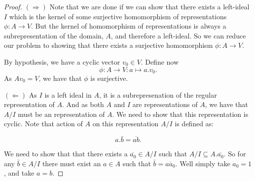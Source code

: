 \begin{proof}

$(\Longrightarrow )$ Note that we are done if we can show that there exists a left-ideal \(I\) which is the kernel of some surjective homomorphism of representations \(\phi :A\rightarrow V\). But the kernel of homomorphism of representations is always a subrepresentation of the domain, \(A\), and therefore a left-ideal. So we can reduce our problem to showing that there exists a surjective homomorphism \(\phi :A\rightarrow V\).

By hypothesis, we have a cyclic vector \(v_{0}\in V\). Define now
\[\phi :A\rightarrow V:a\mapsto a.v_{0}.\]
As \(Av_{0}=V\), we have that \(\phi \) is surjective.

\((\Longleftarrow )\) As \(I\) is a left ideal in \(A\), it is a subrepresenation of the regular representation of \(A\). And as both \(A\) and \(I\) are representations of \(A\), we have that \(A/I\) must be an representation of \(A\). We need to show that this representation is cyclic. Note that action of \(A\) on this representation \(A/I\) is defined as:

\[a.\bar{b}=\overline{ab}.\]

We need to show that  that there exists a \(\overline{a_{0}}\in A/I\) such that \(A/I\subseteq A.\overline{a_{0}}\). So for any \(\bar{b}\in A/I\) there must exist an \(a\in A\) such that \(\bar{b}=\overline{aa_{0}}\). Well simply take \(a_{0}=1\), and take \(a=b\).
\end{proof}